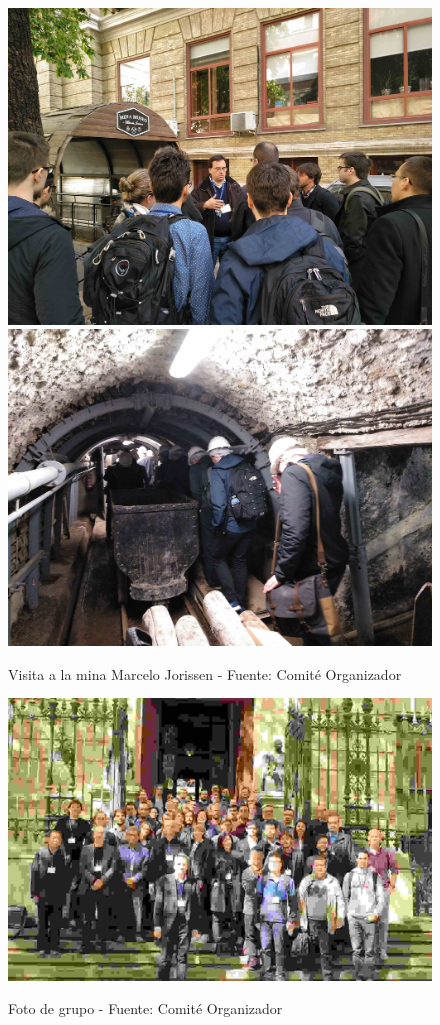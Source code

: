 \documentclass[twoside]{article}
\begin{document}
%
\begin{center}
\begin{figure}
	\centering
		\includegraphics[width=.95\textwidth]{minaJuan}
		\includegraphics[width=.95\textwidth]{Mina}
	\label{fig:Mina}
	\caption{Visita a la mina Marcelo Jorissen - Fuente: Comité Organizador}
\end{figure}
\end{center}
%
\begin{center}
\begin{figure}
	\centering
		\includegraphics[width=.95\textwidth]{Group_Photo}
	\label{fig:GroupPhoto}
	\caption{Foto de grupo - Fuente: Comité Organizador}
\end{figure}
\end{center}
\end{document}

